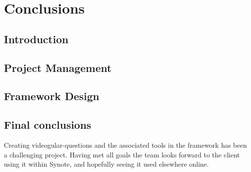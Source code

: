 \chapter{Conclusions} \label{Chapter: Conclusions}

\begin{preamble}
\end{preamble}


\section{Introduction}



\section{Project Management}



\section{Framework Design}


\section{Final conclusions}

Creating videogular-questions and the associated tools in the framework has been a challenging project. Having met all goals the team looks forward to the client using it within Synote, and hopefully seeing it used elsewhere online. 
